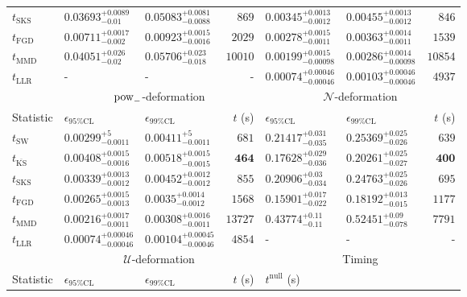\begin{tabular}{l|llr|llr}
	$t_{\mathrm{SKS}}$ & $0.03693_{-0.01}^{+0.0089}$ & $0.05083_{-0.0088}^{+0.0081}$ & $869$ & $0.00345_{-0.0012}^{+0.0013}$ & $0.00455_{-0.0012}^{+0.0013}$ & $846$ \\
	$t_{\mathrm{FGD}}$ & ${\mathbf{0.00711_{-0.002}^{+0.0017}}}$ & ${\mathbf{0.00923_{-0.0016}^{+0.0015}}}$ & $2029$ & $0.00278_{-0.0011}^{+0.0015}$ & $0.00363_{-0.0011}^{+0.0014}$ & $1539$ \\
	$t_{\mathrm{MMD}}$ & $0.04051_{-0.02}^{+0.026}$ & $0.05706_{-0.018}^{+0.023}$ & $10010$ & ${\mathbf{0.00199_{-0.00098}^{+0.0015}}}$ & ${\mathbf{0.00286_{-0.00098}^{+0.0014}}}$ & $10854$ \\
	$t_{\mathrm{LLR}}$ & - & - & - & $0.00074_{-0.00046}^{+0.00046}$ & $0.00103_{-0.00046}^{+0.00046}$ & $4937$ \\
	\toprule
	\multicolumn{1}{c}{} & \multicolumn{3}{c}{$\rm{pow}_{-}$-deformation} & \multicolumn{3}{c}{$\mathcal{N}$-deformation} \\
	Statistic & $\epsilon_{95\%\mathrm{CL}}$ & $\epsilon_{99\%\mathrm{CL}}$ & $t$ (s) & $\epsilon_{95\%\mathrm{CL}}$ & $\epsilon_{99\%\mathrm{CL}}$ & $t$ (s) \\
	\midrule
	$t_{\mathrm{SW}}$ & $0.00299_{-0.0011}^{+5}$ & $0.00411_{-0.0011}^{+5}$ & $681$ & $0.21417_{-0.035}^{+0.031}$ & $0.25369_{-0.026}^{+0.025}$ & $639$ \\
	$t_{\overline{\mathrm{KS}}}$ & $0.00408_{-0.0016}^{+0.0015}$ & $0.00518_{-0.0015}^{+0.0015}$ & ${\mathbf{464}}$ & $0.17628_{-0.036}^{+0.029}$ & $0.20261_{-0.027}^{+0.025}$ & ${\mathbf{400}}$ \\
	$t_{\mathrm{SKS}}$ & $0.00339_{-0.0012}^{+0.0013}$ & $0.00452_{-0.0012}^{+0.0012}$ & $855$ & $0.20906_{-0.034}^{+0.03}$ & $0.24763_{-0.026}^{+0.025}$ & $695$ \\
	$t_{\mathrm{FGD}}$ & $0.00265_{-0.0013}^{+0.0015}$ & $0.0035_{-0.0012}^{+0.0014}$ & $1568$ & ${\mathbf{0.15901_{-0.022}^{+0.017}}}$ & ${\mathbf{0.18192_{-0.015}^{+0.013}}}$ & $1177$ \\
	$t_{\mathrm{MMD}}$ & ${\mathbf{0.00216_{-0.0011}^{+0.0017}}}$ & ${\mathbf{0.00308_{-0.0011}^{+0.0016}}}$ & $13727$ & $0.43774_{-0.11}^{+0.11}$ & $0.52451_{-0.078}^{+0.09}$ & $7791$ \\
	$t_{\mathrm{LLR}}$ & $0.00074_{-0.00046}^{+0.00046}$ & $0.00104_{-0.00046}^{+0.00045}$ & $4854$ & - & - & - \\
	\toprule
	\multicolumn{1}{c}{} & \multicolumn{3}{c}{$\mathcal{U}$-deformation} & \multicolumn{3}{c}{Timing} \\
	Statistic & $\epsilon_{95\%\mathrm{CL}}$ & $\epsilon_{99\%\mathrm{CL}}$ & $t$ (s) & $t^{\mathrm{null}}$ (s) \\

\end{tabular}

